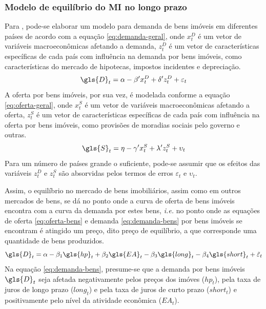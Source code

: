 \documentclass[
	12pt,				%
	oneside,			%
	a4paper,			%
	chapter=TITLE,		%
	section=TITLE,		%
	english,			%
	brazil				%
	]{abntex2}
\begin{document}
\begin{refsection}
\hypertarget{modelo-de-equiluxedbrio-do-no-longo-prazo}{%
\subsubsection{\texorpdfstring{Modelo de equilíbrio do \gls{MI} no longo prazo}{Modelo de equilíbrio do  no longo prazo}}\label{modelo-de-equiluxedbrio-do-no-longo-prazo}}

Para \textcite[p.~6]{ADAMS2010}, pode-se elaborar um modelo para demanda de bens imóveis
em diferentes países de acordo com a equação \eqref{eq:demanda-geral}, onde
\(x_t^D\) é um vetor de variáveis macroeconômicas afetando a demanda, \(z_t^D\) é
um vetor de características específicas de cada país com influência na demanda
por bens imóveis, como características do mercado de hipotecas, impostos
incidentes e depreciação.
\begin{equation}
\gls{D}_t = \alpha - \beta' x_t^D + \delta' z_t^D + \varepsilon_t
\label{eq:demanda-geral}
\end{equation}
A oferta por bens imóveis, por sua vez, é modelada conforme a equação
\eqref{eq:oferta-geral}, onde \(x_t^S\) é um vetor de variáveis macroeconômicas
afetando a oferta, \(z_t^S\) é um vetor de características específicas de cada
país com influência na oferta por bens imóveis, como provisões de moradias
sociais pelo governo e outras.
\begin{equation}
\gls{S}_t = \eta - \gamma' x_t^S + \lambda' z_t^S + \upsilon_t
\label{eq:oferta-geral}
\end{equation}
Para um número de países grande o suficiente, pode-se assumir que os efeitos das
variáveis \(z_t^D\) e \(z_t^S\) são absorvidas pelos termos de erros \(\varepsilon_t\)
e \(\upsilon_t\).

Assim, o equilíbrio no mercado de bens imobiliários, assim como em outros
mercados de bens, se dá no ponto onde a curva de oferta de bens imóveis encontra
com a curva da demanda por estes bens, \emph{i.e.} no ponto onde as equações de
oferta \eqref{eq:oferta-bens} e demanda \eqref{eq:demanda-bens} por bens
imóveis se encontram é atingido um preço, dito preço de equilíbrio, a que
corresponde uma quantidade de bens produzidos.
\begin{equation}
\gls{D}_t = \alpha - \beta_1 \gls{hp}_t + \beta_2 \gls{EA}_t - 
\beta_3 \gls{long}_t - \beta_4 \gls{short}_t + \tilde \varepsilon_t
\label{eq:demanda-bens}
\end{equation}
Na equação \eqref{eq:demanda-bens}, presume-se que a demanda por bens imóveis
\(\gls{D}_t\) seja afetada negativamente pelos preços dos imóves (\(hp_t\)), pela
taxa de juros de longo prazo (\(long_t\)) e pela taxa de juros de curto prazo
(\(short_t\)) e positivamente pelo nível da atividade econômica (\(EA_t\)).


\end{refsection}
\end{document}
